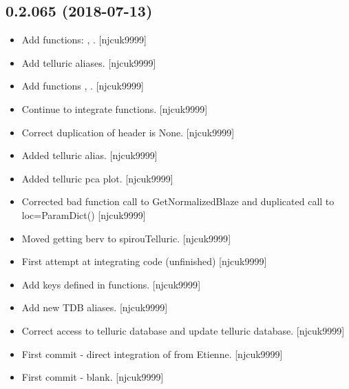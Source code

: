 \documentclass[a4paper,10pt,english]{report}
\begin{document}
\subsection{0.2.065 (2018-07-13)}
\label{\detokenize{misc/changelog:id393}}\begin{itemize}
\item {} 
Add functions: , . {[}njcuk9999{]}

\item {} 
Add telluric aliases. {[}njcuk9999{]}

\item {} 
Add functions , .
{[}njcuk9999{]}

\item {} 
Continue to integrate functions. {[}njcuk9999{]}

\item {} 
Correct duplication of header is None. {[}njcuk9999{]}

\item {} 
Added telluric alias. {[}njcuk9999{]}

\item {} 
Added telluric pca plot. {[}njcuk9999{]}

\item {} 
Corrected bad function call to GetNormalizedBlaze and duplicated call
to loc=ParamDict() {[}njcuk9999{]}

\item {} 
Moved getting berv to spirouTelluric. {[}njcuk9999{]}

\item {} 
First attempt at integrating code (unfinished) {[}njcuk9999{]}

\item {} 
Add keys defined in functions. {[}njcuk9999{]}

\item {} 
Add new TDB aliases. {[}njcuk9999{]}

\item {} 
Correct access to telluric database and update telluric database.
{[}njcuk9999{]}

\item {} 
First commit - direct integration of  from Etienne.
{[}njcuk9999{]}

\item {} 
First commit - blank. {[}njcuk9999{]}


\end{itemize}
\end{document}
